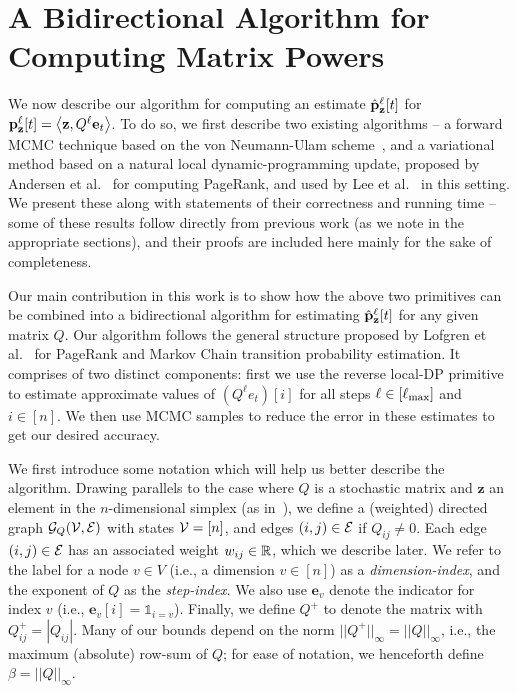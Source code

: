 \section{A Bidirectional Algorithm for Computing Matrix Powers}

We now describe our algorithm for computing an estimate $\hat{\mathbf{p}}_\mathbf{z}^{\ell}[t]$ for ${\mathbf{p}}_\mathbf{z}^{\ell}[t] =\left< \mathbf{z}, Q^{\ell}\mathbf{e}_t \right>$.
To do so, we first describe two existing algorithms -- a forward MCMC technique based on the von Neumann-Ulam scheme~\cite{Wasow1952,ji2013convergence}, and a variational method based on a natural local dynamic-programming update, proposed by Andersen et al.~\cite{andersen2007local} for computing PageRank, and used by Lee et al.~\cite{lee2014asynchronous} in this setting. 
We present these along with statements of their correctness and running time -- some of these results follow directly from previous work (as we note in the appropriate sections), and their proofs are included here mainly for the sake of completeness.


Our main contribution in this work is to show how the above two primitives can be combined into a bidirectional algorithm for estimating $\hat{\mathbf{p}}_\mathbf{z}^{\ell}[t]$ for any given matrix $Q$. 
Our algorithm follows the general structure proposed by Lofgren et al.~\cite{Lofgren2014,banerjee2015fast} for PageRank and Markov Chain transition probability estimation.
It comprises of two distinct components: first we use the reverse local-DP primitive to estimate approximate values of $\left(Q^{\ell}e_t\right)[i]$ for all steps $\ell \in[\ell_{\max}]$ and $i\in[n]$. 
We then use MCMC samples to reduce the error in these estimates to get our desired accuracy.


We first introduce some notation which will help us better describe the algorithm.
Drawing parallels to the case where $Q$ is a stochastic matrix and $\mathbf{z}$ an element in the $n$-dimensional simplex (as in~\cite{banerjee2015fast}), we define a (weighted) directed graph ${\mathcal{G}}_Q({\mathcal{V}},{\mathcal{E}})$ with states ${\mathcal{V}} = [n]$, and edges $(i,j)\in {\mathcal{E}}$ if $Q_{ij}\neq 0$. 
Each edge $(i,j)\in{\mathcal{E}}$ has an associated weight $w_{ij}\in\mathbb{R}$, which we describe later.
We refer to the label for a node $v\in V$ (i.e., a dimension $v\in[n]$) as a \emph{dimension-index}, and the exponent of $Q$ as the \emph{step-index}.
We also use $\mathbf{e}_v$ denote the indicator for index $v$ (i.e., $\mathbf{e}_v[i] = \mathds{1}_{i=v}$). 
Finally, we define $Q^+$ to denote the matrix with $Q^+_{ij} = |Q_{ij}|$. 
Many of our bounds depend on the norm $||Q^+||_{\infty} = ||Q||_{\infty}$, i.e., the maximum (absolute) row-sum of $Q$; for ease of notation, we henceforth define $\beta = ||Q||_{\infty}$. 

